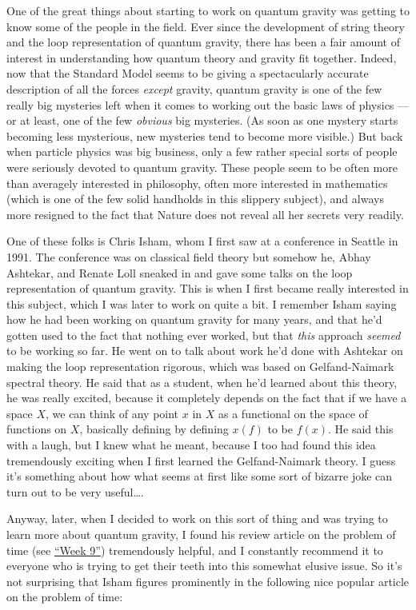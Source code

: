\documentclass{article}
\begin{document}
One of the great things about starting to work on quantum gravity was
getting to know some of the people in the field. Ever since the
development of string theory and the loop representation of quantum
gravity, there has been a fair amount of interest in understanding how
quantum theory and gravity fit together. Indeed, now that the Standard
Model seems to be giving a spectacularly accurate description of all the
forces \emph{except} gravity, quantum gravity is one of the few really
big mysteries left when it comes to working out the basic laws of
physics --- or at least, one of the few \emph{obvious} big mysteries.
(As soon as one mystery starts becoming less mysterious, new mysteries
tend to become more visible.) But back when particle physics was big
business, only a few rather special sorts of people were seriously
devoted to quantum gravity. These people seem to be often more than
averagely interested in philosophy, often more interested in mathematics
(which is one of the few solid handholds in this slippery subject), and
always more resigned to the fact that Nature does not reveal all her
secrets very readily.

One of these folks is Chris Isham, whom I first saw at a conference in
Seattle in 1991. The conference was on classical field theory but
somehow he, Abhay Ashtekar, and Renate Loll sneaked in and gave some
talks on the loop representation of quantum gravity. This is when I
first became really interested in this subject, which I was later to
work on quite a bit. I remember Isham saying how he had been working on
quantum gravity for many years, and that he'd gotten used to the fact
that nothing ever worked, but that \emph{this} approach \emph{seemed} to
be working so far. He went on to talk about work he'd done with Ashtekar
on making the loop representation rigorous, which was based on
Gelfand-Naimark spectral theory. He said that as a student, when he'd
learned about this theory, he was really excited, because it completely
depends on the fact that if we have a space \(X\), we can think of any
point \(x\) in \(X\) as a functional on the space of functions on \(X\),
basically defining by defining \(x(f)\) to be \(f(x)\). He said this
with a laugh, but I knew what he meant, because I too had found this
idea tremendously exciting when I first learned the Gelfand-Naimark
theory. I guess it's something about how what seems at first like some
sort of bizarre joke can turn out to be very useful\ldots.

Anyway, later, when I decided to work on this sort of thing and was
trying to learn more about quantum gravity, I found his review article
on the problem of time (see \protect\hyperlink{week9}{``Week 9''})
tremendously helpful, and I constantly recommend it to everyone who is
trying to get their teeth into this somewhat elusive issue. So it's not
surprising that Isham figures prominently in the following nice popular
article on the problem of time:
\end{document}
